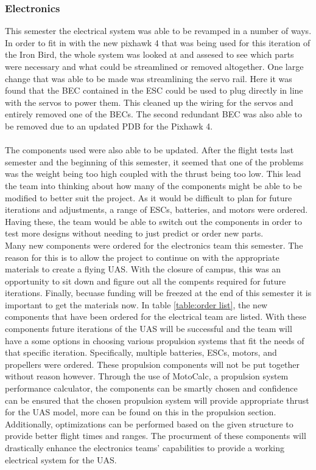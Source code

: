 \documentclass{article}
\begin{document}
\subsubsection{Electronics}
This semester the electrical system was able to be revamped in a number of ways. In order to fit in with the new pixhawk 4 that was being used for this iteration of the Iron Bird, the whole system was looked at and assesed to see which parts were necessary and what could be streamlined or removed altogether. One large change that was able to be made was streamlining the servo rail. Here it was found that the BEC contained in the ESC could be used to plug directly in line with the servos to power them. This cleaned up the wiring for the servos and entirely removed one of the BECs. The second redundant BEC was also able to be removed due to an updated PDB for the Pixhawk 4. \\\\
The components used were also able to be updated. After the flight tests last semester and the beginning of this semester, it seemed that one of the problems was the weight being too high coupled with the thrust being too low. This lead the team into thinking about how many of the components might be able to be modified to better suit the project. As it would be difficult to plan for future iterations and adjustments, a range of ESCs, batteries, and motors were ordered. Having these, the team would be able to switch out the components in order to test more designs without needing to just predict or order new parts. \\

Many new components were ordered for the electronics team this semester. The reason for this is to allow the project to continue on with the appropriate materials to create a flying UAS. With the closure of campus, this was an opportunity to sit down and figure out all the compents required for future iterations. Finally, becuase funding will be freezed at the end of this semester it is important to get the materials now. In table \ref{table:order list}, the new components that have been ordered for the electrical team are listed. With these components future iterations of the UAS will be successful and the team will have a some options in choosing various propulsion systems that fit the needs of that specific iteration. Specifically, multiple batteries, ESCs, motors, and propellers were ordered. These propulsion components will not be put together without reason however. Through the use of MotoCalc, a propulsion system performance calculator, the components can be smartly chosen and confidence can be ensured that the chosen propulsion system will provide appropriate thrust for the UAS model, more can be found on this in the propulsion section. Additionally, optimizations can be performed based on the given structure to provide better flight times and ranges. The procurment of these components will drastically enhance the electronics teams' capabilities to provide a working electrical system for the UAS. \\ \\
\end{document}
